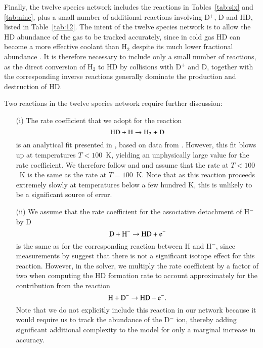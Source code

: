 Finally, the twelve species network includes the reactions in Tables~\ref{tab:six} and \ref{tab:nine}, plus a small number of additional reactions involving
D$^{+}$, D and HD, listed in Table~\ref{tab:12}. The intent of the twelve species network is to allow the HD abundance of the gas to be tracked accurately,
since in cold gas HD can become a more effective coolant than H$_{2}$ despite its much lower fractional abundance \citep[see e.g.][]{2006MNRAS.366..247J,2008ApJ...685....8M}. It is therefore necessary to include only a small number of reactions, as the direct conversion of H$_{2}$ to HD by collisions with D$^{+}$ and D, together with the
corresponding inverse reactions generally dominate the production and destruction of HD.

Two reactions in the twelve species network require further discussion:
\begin{enumerate}
\item[(i)] The rate coefficient that we adopt for the reaction
\begin{equation}
{\rm HD + H} \rightarrow {\rm H_{2} + D}
\end{equation}
is an analytical fit presented in \citet{2002P&SS...50.1197G}, based on data from \citet{1959JChPh..31.1359S}. However, this fit blows up
at temperatures $T < 100$~K, yielding an unphysically large value for the rate coefficient. We therefore follow \citet{2007MNRAS.376..709R}
and \citet{2008ApJ...685....8M} and assume that the rate at $T < 100$~K is the same as the rate at $T = 100$~K. Note that as this reaction
proceeds extremely slowly at temperatures below a few hundred K, this is unlikely to be a significant source of error. 
\item[(ii)] We assume that the rate coefficient for the associative detachment of H$^{-}$ by D
\begin{equation}
{\rm D + H^{-} \rightarrow  HD + e^{-}}
\end{equation}
is the same as for the corresponding reaction between H and H$^{-}$, since measurements by \citet{2012PhRvA..86c2714M} suggest that
there is not a significant isotope effect for this reaction. However, in the solver, we multiply the rate coefficient by a factor of two when
computing the HD formation rate to account approximately for the contribution from the reaction
\begin{equation}
{\rm H + D^{-} \rightarrow  HD + e^{-}}.
\end{equation}
Note that we do not explicitly include this reaction in our network because it would require us to track the abundance of the D$^{-}$ ion,
thereby adding significant additional complexity to the model for only a marginal increase in accuracy.
\end{enumerate}

